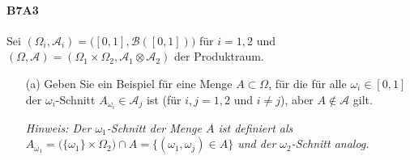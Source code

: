 \documentclass{article}
\begin{document}
\paragraph{B7A3}
Sei $(\Omega_i,\mathcal{A}_i)=\bigl([0,1],\mathcal{B}([0,1])\bigr)$ für $i=1,2$ und $(\Omega,\mathcal{A})=(\Omega_1\times\Omega_2,\mathcal{A}_1\otimes\mathcal{A}_2)$ der Produktraum.
\begin{enumerate}
\item[(a)] Geben Sie ein Beispiel für eine Menge
  $A\subset\Omega$, für die für alle $\omega_i\in[0,1]$ der
  $\omega_i$-Schnitt $A_{\omega_i}\in\mathcal{A}_j$ ist (für
  $i,j=1,2$ und $i\neq j$), aber $A\notin\mathcal{A}$ gilt.

  \emph{Hinweis: Der $\omega_1$-Schnitt der Menge $A$ ist definiert als $A_{\omega_1}=\bigl(\{\omega_1\}\times\Omega_2\bigr)\cap A=\{(\omega_1,\omega_j)\in A\}$ und der $\omega_2$-Schnitt analog.}
\end{enumerate}
\end{document}

